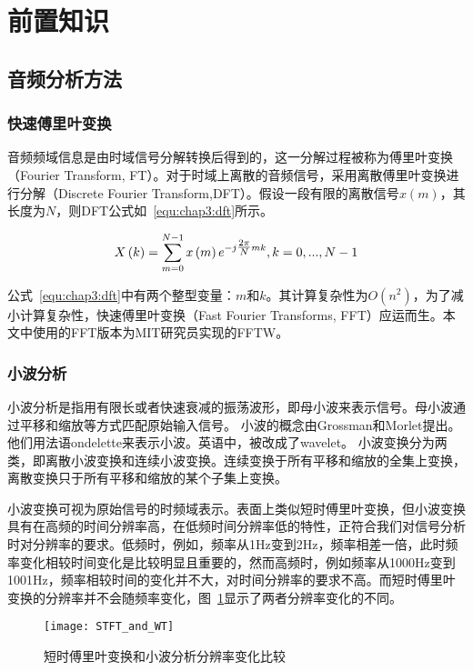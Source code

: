 \section{前置知识}

\subsection{音频分析方法}
\subsubsection{快速傅里叶变换}
音频频域信息是由时域信号分解转换后得到的，这一分解过程被称为傅里叶变换（Fourier Transform, FT）。对于时域上离散的音频信号，采用离散傅里叶变换进行分解（Discrete Fourier Transform,DFT）。假设一段有限的离散信号$x(m)$，其长度为$N$，则DFT公式如~\ref{equ:chap3:dft}所示。

\begin{equation}
\label{equ:chap3:dft}
X\left( k \right) = \sum\limits_{m = 0}^{N - 1} {x\left( m \right){e^{ - j{\textstyle{{2\pi } \over N}}mk}},k = 0,...,N - 1}
\end{equation}

公式~\ref{equ:chap3:dft}中有两个整型变量：$m$和$k$。其计算复杂性为$O\left( n^2 \right)$，为了减小计算复杂性，快速傅里叶变换（Fast Fourier Transforms, FFT）应运而生。本文中使用的FFT版本为MIT研究员实现的FFTW。


\subsubsection{小波分析}
小波分析是指用有限长或者快速衰减的振荡波形，即母小波来表示信号。母小波通过平移和缩放等方式匹配原始输入信号。
小波的概念由Grossman和Morlet提出。他们用法语ondelette来表示小波。英语中，被改成了wavelet。
小波变换分为两类，即离散小波变换和连续小波变换。连续变换于所有平移和缩放的全集上变换，离散变换只于所有平移和缩放的某个子集上变换。

小波变换可视为原始信号的时频域表示。表面上类似短时傅里叶变换，但小波变换具有在高频的时间分辨率高，在低频时间分辨率低的特性，正符合我们对信号分析时对分辨率的要求。低频时，例如，频率从1Hz变到2Hz，频率相差一倍，此时频率变化相较时间变化是比较明显且重要的，然而高频时，例如频率从1000Hz变到1001Hz，频率相较时间的变化并不大，对时间分辨率的要求不高。而短时傅里叶变换的分辨率并不会随频率变化，图~\ref{fig:STFT_and_WT}显示了两者分辨率变化的不同。

\begin{figure}[htbp] %
  \centering
  \texttt{[image: STFT\_and\_WT]}
  \caption{短时傅里叶变换和小波分析分辨率变化比较}
  \label{fig:STFT_and_WT}
\end{figure}



